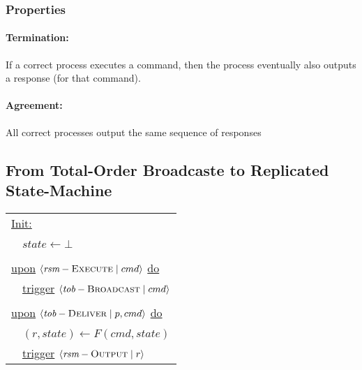 \documentclass{article}
\begin{document}
\begin{adjustwidth}{2em}{2em}
\begin{adjustwidth}{2em}{2em}
			\subsubsection{Properties}
			\begin{adjustwidth}{2em}{}
				\hfill \vspace{-1cm}
				\paragraph{Termination:}
				\begin{adjustwidth}{1em}{}
					If a correct process executes a command, then the process eventually also outputs a response (for that command).
				\end{adjustwidth}
				\paragraph{Agreement:}
				\begin{adjustwidth}{1em}{}
					All correct processes output the same sequence of responses
				\end{adjustwidth}
			\end{adjustwidth}
		\end{adjustwidth}
		\subsection{From Total-Order Broadcaste to Replicated State-Machine}
		\begin{adjustwidth}{2em}{2em}
			\begin{center}
				\begin{tabular}{l}
					\underline{Init:} \\
					\ \ $\textit{state} \leftarrow \bot$ \\
					\\
					\underline{upon} $\langle \textit{rsm}-\textsc{Execute} \mid cmd \rangle$ \underline{do} \\
					\ \ \underline{trigger} $\langle \textit{tob}-\textsc{Broadcast} \mid cmd \rangle$ \\
					\\
					\underline{upon} $\langle \textit{tob}-\textsc{Deliver} \mid p, cmd \rangle$ \underline{do} \\
					\ \ $(r, \textit{state}) \leftarrow F(cmd, \textit{state})$ \\
					\ \ \underline{trigger} $\langle \textit{rsm}-\textsc{Output} \mid r \rangle$
				\end{tabular}
			\end{center}
		\end{adjustwidth}
	\end{adjustwidth}
	
\end{document}
